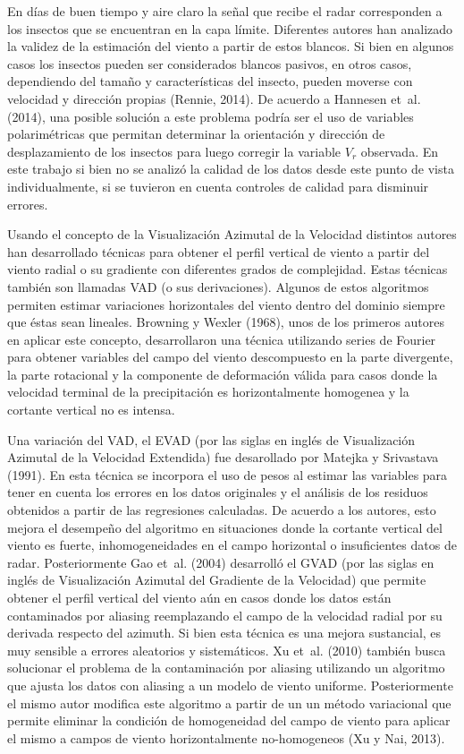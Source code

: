 \documentclass[12pt,spanish,oneside, a4paper]{book}
\begin{document}
En días de buen tiempo y aire claro la señal que recibe el radar
corresponden a los insectos que se encuentran en la capa límite.
Diferentes autores han analizado la validez de la estimación del viento
a partir de estos blancos. Si bien en algunos casos los insectos pueden
ser considerados blancos pasivos, en otros casos, dependiendo del tamaño
y características del insecto, pueden moverse con velocidad y dirección
propias (Rennie, 2014). De acuerdo a Hannesen et~al. (2014), una posible
solución a este problema podría ser el uso de variables polarimétricas
que permitan determinar la orientación y dirección de desplazamiento de
los insectos para luego corregir la variable \(V_r\) observada. En este
trabajo si bien no se analizó la calidad de los datos desde este punto
de vista individualmente, si se tuvieron en cuenta controles de calidad
para disminuir errores.

Usando el concepto de la Visualización Azimutal de la Velocidad
distintos autores han desarrollado técnicas para obtener el perfil
vertical de viento a partir del viento radial o su gradiente con
diferentes grados de complejidad. Estas técnicas también son llamadas
VAD (o sus derivaciones). Algunos de estos algoritmos permiten estimar
variaciones horizontales del viento dentro del dominio siempre que éstas
sean lineales. Browning y Wexler (1968), unos de los primeros autores en
aplicar este concepto, desarrollaron una técnica utilizando series de
Fourier para obtener variables del campo del viento descompuesto en la
parte divergente, la parte rotacional y la componente de deformación
válida para casos donde la velocidad terminal de la precipitación es
horizontalmente homogenea y la cortante vertical no es intensa.

Una variación del VAD, el EVAD (por las siglas en inglés de
Visualización Azimutal de la Velocidad Extendida) fue desarollado por
Matejka y Srivastava (1991). En esta técnica se incorpora el uso de
pesos al estimar las variables para tener en cuenta los errores en los
datos originales y el análisis de los residuos obtenidos a partir de las
regresiones calculadas. De acuerdo a los autores, esto mejora el
desempeño del algoritmo en situaciones donde la cortante vertical del
viento es fuerte, inhomogeneidades en el campo horizontal o
insuficientes datos de radar. Posteriormente Gao et~al. (2004)
desarrolló el GVAD (por las siglas en inglés de Visualización Azimutal
del Gradiente de la Velocidad) que permite obtener el perfil vertical
del viento aún en casos donde los datos están contaminados por aliasing
reemplazando el campo de la velocidad radial por su derivada respecto
del azimuth. Si bien esta técnica es una mejora sustancial, es muy
sensible a errores aleatorios y sistemáticos. Xu et~al. (2010) también
busca solucionar el problema de la contaminación por aliasing utilizando
un algoritmo que ajusta los datos con aliasing a un modelo de viento
uniforme. Posteriormente el mismo autor modifica este algoritmo a partir
de un un método variacional que permite eliminar la condición de
homogeneidad del campo de viento para aplicar el mismo a campos de
viento horizontalmente no-homogeneos (Xu y Nai, 2013).
\end{document}
